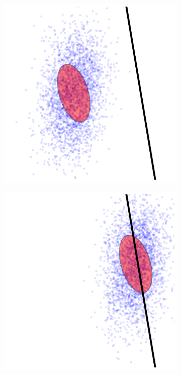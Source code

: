 \begin{figure}
\centering
\begin{subfigure}{0.3\textwidth}
\centering
\includegraphics[scale=0.25]{./images/wall_robot.png}
\caption{}
\label{wall_robota}
\end{subfigure}
\begin{subfigure}{0.3\textwidth}
\centering
\includegraphics[scale=0.25]{./images/wall_onrobot.png}

\end{subfigure}
\end{figure}
